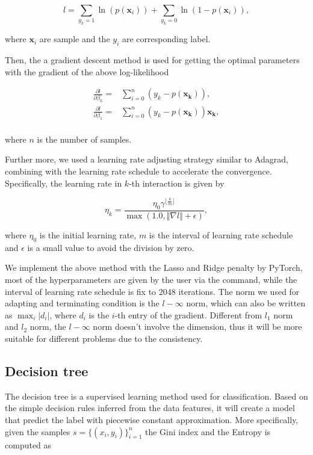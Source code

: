 \documentclass[11pt]{article}
\begin{document}
$$
  l = \sum_{y_k = 1} \ln(p (\mathbf{x}_i)) + \sum_{y_k = 0} \ln(1 - p (\mathbf{x}_i)),
$$

\noindent where $\mathbf{x}_i$ are sample and the $y_i$ are corresponding label.

Then, the a gradient descent method is used for getting the optimal parameters with the gradient of the above log-likelihood

$$
  \begin{aligned}
    \frac{\partial l}{\partial \beta_0} = & \sum_{i=0}^n (y_k - p (\mathbf{x_k})),              \\
    \frac{\partial l}{\partial \beta_1} = & \sum_{i=0}^n (y_k - p (\mathbf{x_k})) \mathbf{x_k}, \\
  \end{aligned}
$$

\noindent where $n$ is the number of samples.

Further more, we used a learning rate adjusting strategy similar to Adagrad, combining with the learning rate schedule to accelerate the convergence. Specifically, the learning rate in $k$-th interaction is given by

$$
  \eta_k = \frac{\eta_0 \gamma^{\lfloor \frac{k}{m} \rfloor}}{\max(1.0, \Vert \nabla l \Vert + \epsilon)},
$$

\noindent where $\eta_0$ is the initial learning rate, $m$ is the interval of learning rate schedule and $\epsilon$ is a small value to avoid the division by zero.

We implement the above method with the Lasso and Ridge penalty by PyTorch, most of the hyperparameters are given by the user via the command, while the interval of learning rate schedule is fix to $2048$ iterations. The norm we used for adapting and terminating condition is the $l-\infty$ norm, which can also be written as $\max_{i} \vert d_i \vert$, where $d_i$ is the $i$-th entry of the gradient. Different from $l_1$ norm and $l_2$ norm, the $l-\infty$ norm doesn't involve the dimension, thus it will be more suitable for different problems due to the consistency.

\subsection{Decision tree}

The decision tree \cite{utgoff1989incremental} \cite{kotsiantis2013decision} is a supervised learning method used for classification. Based on the simple decision rules inferred from the data features, it will create a model that predict the label with piecewise constant approximation. More specifically, given the samples $s = \{(x_i, y_i)\}_{i=1}^n$ the Gini index and the Entropy is computed as
\end{document}

